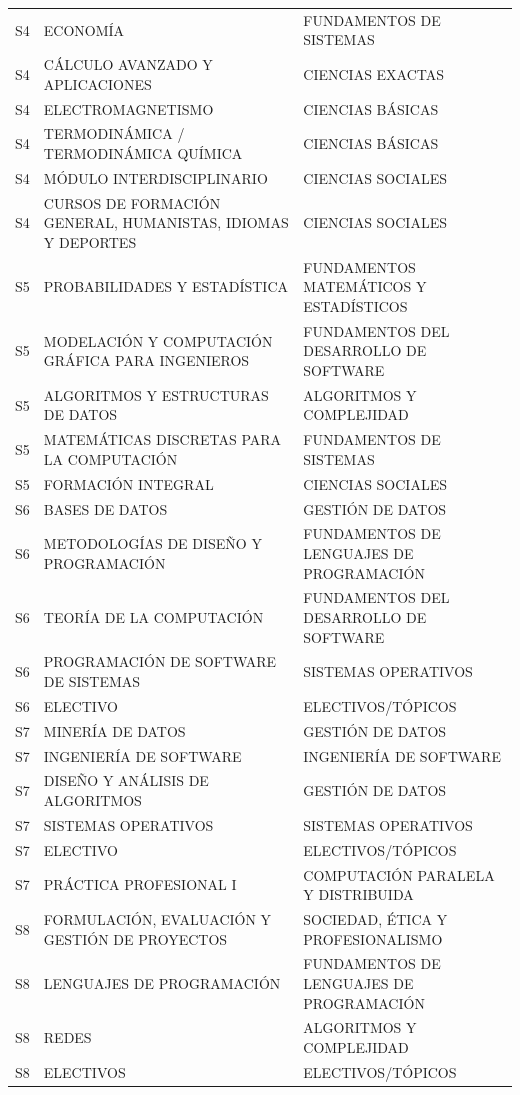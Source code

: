 \documentclass[11pt,a4paper]{article}
\begin{document}
\begin{small}
\begin{longtable}{c >{\raggedright\arraybackslash}p{8.5cm} >{\raggedright\arraybackslash}p{5.5cm}}
S4 & ECONOMÍA & FUNDAMENTOS DE SISTEMAS \\
S4 & CÁLCULO AVANZADO Y APLICACIONES & CIENCIAS EXACTAS \\
S4 & ELECTROMAGNETISMO & CIENCIAS BÁSICAS \\
S4 & TERMODINÁMICA / TERMODINÁMICA QUÍMICA & CIENCIAS BÁSICAS \\
S4 & MÓDULO INTERDISCIPLINARIO & CIENCIAS SOCIALES \\
S4 & CURSOS DE FORMACIÓN GENERAL, HUMANISTAS, IDIOMAS Y DEPORTES & CIENCIAS SOCIALES \\
S5 & PROBABILIDADES Y ESTADÍSTICA & FUNDAMENTOS MATEMÁTICOS Y ESTADÍSTICOS \\
S5 & MODELACIÓN Y COMPUTACIÓN GRÁFICA PARA INGENIEROS & FUNDAMENTOS DEL DESARROLLO DE SOFTWARE \\
S5 & ALGORITMOS Y ESTRUCTURAS DE DATOS & ALGORITMOS Y COMPLEJIDAD \\
S5 & MATEMÁTICAS DISCRETAS PARA LA COMPUTACIÓN & FUNDAMENTOS DE SISTEMAS \\
S5 & FORMACIÓN INTEGRAL & CIENCIAS SOCIALES \\
S6 & BASES DE DATOS & GESTIÓN DE DATOS \\
S6 & METODOLOGÍAS DE DISEÑO Y PROGRAMACIÓN & FUNDAMENTOS DE LENGUAJES DE PROGRAMACIÓN \\
S6 & TEORÍA DE LA COMPUTACIÓN & FUNDAMENTOS DEL DESARROLLO DE SOFTWARE \\
S6 & PROGRAMACIÓN DE SOFTWARE DE SISTEMAS & SISTEMAS OPERATIVOS \\
S6 & ELECTIVO & ELECTIVOS/TÓPICOS \\
S7 & MINERÍA DE DATOS & GESTIÓN DE DATOS \\
S7 & INGENIERÍA DE SOFTWARE & INGENIERÍA DE SOFTWARE \\
S7 & DISEÑO Y ANÁLISIS DE ALGORITMOS & GESTIÓN DE DATOS \\
S7 & SISTEMAS OPERATIVOS & SISTEMAS OPERATIVOS \\
S7 & ELECTIVO & ELECTIVOS/TÓPICOS \\
S7 & PRÁCTICA PROFESIONAL I & COMPUTACIÓN PARALELA Y DISTRIBUIDA \\
S8 & FORMULACIÓN, EVALUACIÓN Y GESTIÓN DE PROYECTOS & SOCIEDAD, ÉTICA Y PROFESIONALISMO \\
S8 & LENGUAJES DE PROGRAMACIÓN & FUNDAMENTOS DE LENGUAJES DE PROGRAMACIÓN \\
S8 & REDES & ALGORITMOS Y COMPLEJIDAD \\
S8 & ELECTIVOS & ELECTIVOS/TÓPICOS \\

\end{longtable}
\end{small}
\end{document}
